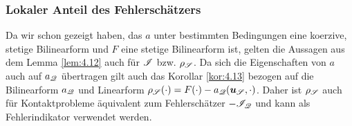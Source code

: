 \subsubsection{Lokaler Anteil des Fehlerschätzers}

Da wir schon gezeigt haben, das $a$ unter bestimmten Bedingungen eine koerzive, stetige Bilinearform und $F$ eine stetige Bilinearform ist, gelten die Aussagen aus dem Lemma \ref{lem:4.12} auch für $\mathscr I$ bzw. $\rho_{\mathscr S}$. Da sich die Eigenschaften von $a$ auch auf $a_{\mathscr Q}$ übertragen gilt auch das Korollar \ref{kor:4.13} bezogen auf die Bilinearform $a_{\mathscr Q}$ und Linearform $\rho_{\mathscr S} (\cdot)= F(\cdot)-a_{\mathscr Q}(\boldsymbol u_{\mathscr S},\cdot)$. Daher ist $\rho_{\mathscr S}$ auch für Kontaktprobleme äquivalent zum Fehlerschätzer $-\mathscr I_{\mathscr Q}$ und kann als Fehlerindikator verwendet werden.

